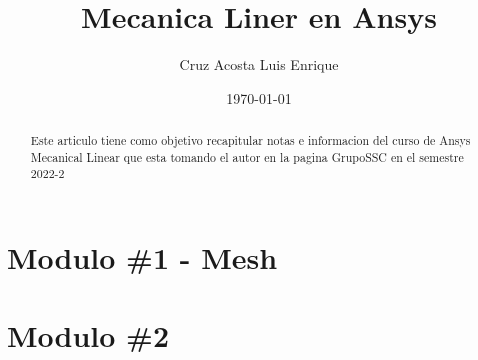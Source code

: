 \documentclass{article}
\title{Mecanica Liner en Ansys}
\author{Cruz Acosta Luis Enrique}
\date{\today}
\begin{document}
 
\maketitle

\tableofcontents

\begin{abstract}
    Este articulo tiene como objetivo recapitular notas e informacion 
    del curso de Ansys Mecanical Linear que esta tomando el autor en la pagina
    GrupoSSC en el semestre 2022-2
\end{abstract}

\section{Modulo \#1 - Mesh}

\section{Modulo \#2}

 
 
\end{document}
